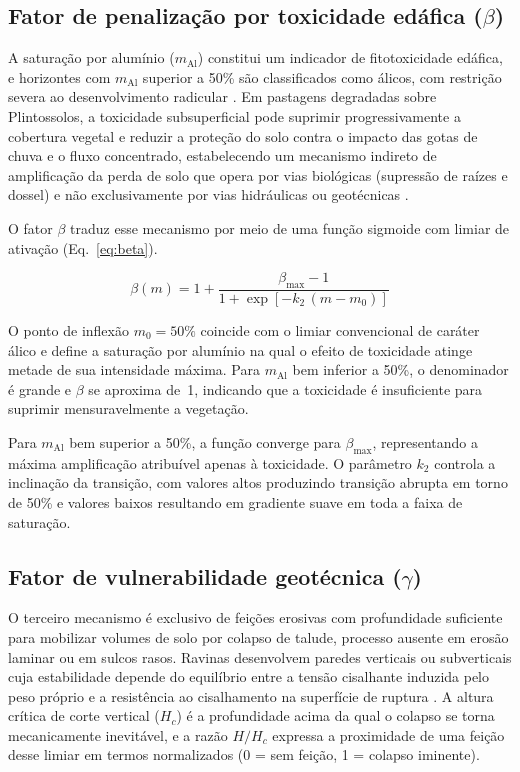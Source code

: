 \documentclass[preprint,review,12pt,authoryear]{elsarticle}
\begin{document}
\subsection{Fator de penalização por toxicidade edáfica ($\beta$)}

A saturação por alumínio ($m_{\mathrm{Al}}$) constitui um indicador de fitotoxicidade edáfica, e horizontes com $m_{\mathrm{Al}}$ superior a 50\% são classificados como álicos, com restrição severa ao desenvolvimento radicular \citep{embrapa_2018}. Em pastagens degradadas sobre Plintossolos, a toxicidade subsuperficial pode suprimir progressivamente a cobertura vegetal e reduzir a proteção do solo contra o impacto das gotas de chuva e o fluxo concentrado, estabelecendo um mecanismo indireto de amplificação da perda de solo que opera por vias biológicas (supressão de raízes e dossel) e não exclusivamente por vias hidráulicas ou geotécnicas \citep{kochian_et_al_2005,gyssels_et_al_2005}.

O fator $\beta$ traduz esse mecanismo por meio de uma função sigmoide com limiar de ativação (Eq.~\ref{eq:beta}).

\begin{equation}
\beta(m) = 1 + \frac{\beta_{\max} - 1}{1 + \exp\!\left[-k_2\,(m - m_0)\right]}
\label{eq:beta}
\end{equation}

O ponto de inflexão $m_0 = 50\%$ coincide com o limiar convencional de caráter álico e define a saturação por alumínio na qual o efeito de toxicidade atinge metade de sua intensidade máxima. Para $m_{\mathrm{Al}}$ bem inferior a 50\%, o denominador é grande e $\beta$ se aproxima de~1, indicando que a toxicidade é insuficiente para suprimir mensuravelmente a vegetação. 

Para $m_{\mathrm{Al}}$ bem superior a 50\%, a função converge para $\beta_{\max}$, representando a máxima amplificação atribuível apenas à toxicidade. O parâmetro $k_2$ controla a inclinação da transição, com valores altos produzindo transição abrupta em torno de 50\% e valores baixos resultando em gradiente suave em toda a faixa de saturação.

\subsection{Fator de vulnerabilidade geotécnica ($\gamma$)}

O terceiro mecanismo é exclusivo de feições erosivas com profundidade suficiente para mobilizar volumes de solo por colapso de talude, processo ausente em erosão laminar ou em sulcos rasos. Ravinas desenvolvem paredes verticais ou subverticais cuja estabilidade depende do equilíbrio entre a tensão cisalhante induzida pelo peso próprio e a resistência ao cisalhamento na superfície de ruptura \citep{fredlund_rahardjo_1993}. A altura crítica de corte vertical ($H_c$) é a profundidade acima da qual o colapso se torna mecanicamente inevitável, e a razão $H/H_c$ expressa a proximidade de uma feição desse limiar em termos normalizados (0 = sem feição, 1 = colapso iminente).
\end{document}
